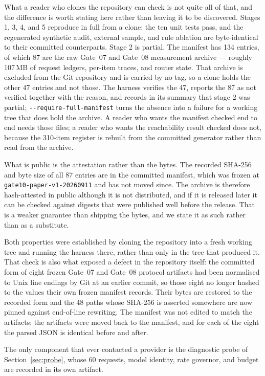 \documentclass[11pt]{article}
\begin{document}
What a reader who clones the repository can check is not quite all of that, and
the difference is worth stating here rather than leaving it to be discovered.
Stages 1, 3, 4, and 5 reproduce in full from a clone: the ten unit tests pass,
and the regenerated synthetic audit, external sample, and rule ablation are
byte-identical to their committed counterparts. Stage 2 is partial. The
manifest has 134 entries, of which 87 are the raw Gate~07 and Gate~08
measurement archive --- roughly 107\,MB of request ledgers, per-item traces,
and router state. That archive is excluded from the Git repository and is
carried by no tag, so a clone holds the other 47 entries and not those. The
harness verifies the 47, reports the 87 as not verified together with the
reason, and records in its summary that stage 2 was partial;
\texttt{{-}{-}require-full-manifest} turns the absence into a failure for a
working tree that does hold the archive. A reader who wants the manifest
checked end to end needs those files; a reader who wants the reachability
result checked does not, because the 310-item register is rebuilt from the
committed generator rather than read from the archive.

What is public is the attestation rather than the bytes. The recorded SHA-256
and byte size of all 87 entries are in the committed manifest, which was frozen
at \texttt{gate10-paper-v1-20260911} and has not moved since. The archive is
therefore hash-attested in public although it is not distributed, and if it is
released later it can be checked against digests that were published well
before the release. That is a weaker guarantee than shipping the bytes, and we
state it as such rather than as a substitute.

Both properties were established by cloning the repository into a fresh working
tree and running the harness there, rather than only in the tree that produced
it. That check is also what exposed a defect in the repository itself: the
committed form of eight frozen Gate~07 and Gate~08 protocol artifacts had been
normalised to Unix line endings by Git at an earlier commit, so those eight no
longer hashed to the values their own frozen manifest records. Their bytes are
restored to the recorded form and the 48 paths whose SHA-256 is asserted
somewhere are now pinned against end-of-line rewriting. The manifest was not
edited to match the artifacts; the artifacts were moved back to the manifest,
and for each of the eight the parsed JSON is identical before and after.

The only component that ever contacted a provider is the diagnostic probe of
Section~\ref{sec:probe}, whose 60 requests, model identity, rate governor, and
budget are recorded in its own artifact.
\end{document}
